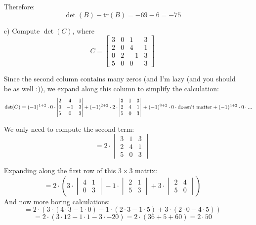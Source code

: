 \begin{sol}
\begin{enumerate}
        Therefore:
        \[
        \det(B) - \text{tr}(B) = -69 - 6 = -75
        \]
    
            \item[c)] Compute $\det(C)$, where 
        \[
        C = \begin{bmatrix} 3 & 0 & 1 & 3 \\ 2 & 0 & 4 & 1 \\ 0 & 2 & -1 & 3 \\ 5 & 0 & 0 & 3 \end{bmatrix}
        \]

        Since the second column contains many zeros (and I'm lazy (and you should be as well :)), we expand along this column to simplify the calculation:
        \[
        \det(C) = (-1)^{1+2} \cdot 0 \cdot \begin{vmatrix} 2 & 4 & 1 \\ 0 & -1 & 3 \\ 5 & 0 & 3 \end{vmatrix} + \\ (-1)^{2+2} \cdot 2 \cdot \begin{vmatrix} 3 & 1 & 3 \\ 2 & 4 & 1 \\ 5 & 0 & 3 \end{vmatrix} \\ + (-1)^{3+2} \cdot 0 \cdot \text{doesn't matter} + \\ (-1)^{4+2} \cdot 0
        \cdot \text{...}
        \]

        We only need to compute the second term:
        \[
    = 2 \cdot \begin{vmatrix} 3 & 1 & 3 \\ 2 & 4 & 1 \\ 5 & 0 & 3 \end{vmatrix}
        \]

        Expanding along the first row of this $3 \times 3$ matrix:
        \[
        = 2 \cdot \left( 3 \cdot \begin{vmatrix} 4 & 1 \\ 0 & 3 \end{vmatrix} - 1 \cdot \begin{vmatrix} 2 & 1 \\ 5 & 3 \end{vmatrix} + 3 \cdot \begin{vmatrix} 2 & 4 \\ 5 & 0 \end{vmatrix} \right)
        \]
        And now more boring calculations:
        \[
        = 2 \cdot \left( 3 \cdot (4 \cdot 3 - 1 \cdot 0) - 1 \cdot (2 \cdot 3 - 1 \cdot 5) + 3 \cdot (2 \cdot 0 - 4 \cdot 5) \right)
        \]
        \[
        = 2 \cdot \left( 3 \cdot 12 - 1 \cdot 1 - 3 \cdot -20 \right) = 2 \cdot (36 + 5 + 60) = 2 \cdot 50
        \]


\end{enumerate}
\end{sol}
